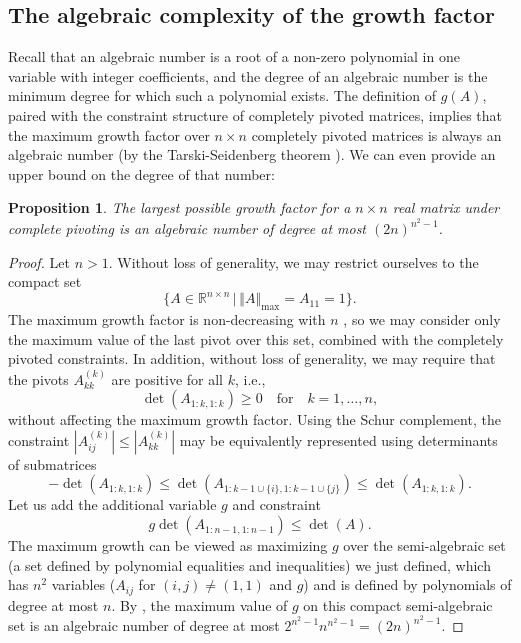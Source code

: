 \documentclass[reqno]{amsart}
\numberwithin{equation}{section}
\newcommand{\norm}[1]{\left\Vert #1 \right\Vert}
\newtheorem{proposition}[theorem]{Proposition}
\begin{document}
\subsection{The algebraic complexity of the growth factor} Recall that an algebraic number is a root of a non-zero polynomial in one variable with integer coefficients, and the degree of an algebraic number is the minimum degree for which such a polynomial exists. The definition of $g(A)$, paired with the constraint structure of completely pivoted matrices, implies that the maximum growth factor over $n \times n$ completely pivoted matrices is always an algebraic number (by the Tarski-Seidenberg theorem \cite[Theorem 1.5.8]{scheiderer2024course}). We can even provide an upper bound on the degree of that number:

\begin{proposition}\label{thm:algebraic}
The largest possible growth factor for a $n \times n$ real matrix under complete pivoting is an algebraic number of degree at most $(2n)^{n^2-1}$.
\end{proposition}

\begin{proof}
Let $n>1$. Without loss of generality, we may restrict ourselves to the compact set 
\begin{equation}\{A \in \mathbb{R}^{n \times n} \, | \, \norm{A}_{\max} = A_{11} = 1\}.\end{equation} 
The maximum growth factor is non-decreasing with $n$ \cite[Lemma 5.1]{edelman2024some}, so we may consider only the maximum value of the last pivot over this set, combined with the completely pivoted constraints. In addition, without loss of generality, we may require that the pivots $A^{(k)}_{kk}$ are positive for all $k$, i.e.,
\begin{equation} \det(A_{1:k,1:k}) \ge 0 \quad \text{for} \quad k = 1,\ldots,n, \end{equation}
without affecting the maximum growth factor. Using the Schur complement, the constraint $|A_{ij}^{(k)}|\le |A_{kk}^{(k)}|$ may be equivalently represented using determinants of submatrices
\begin{equation}-\det(A_{1:k,1:k}) \le \det(A_{1:k-1 \cup \{i\},1:k-1 \cup \{j\}}) \le \det(A_{1:k,1:k}).\end{equation}
Let us add the additional variable $g$ and constraint 
\begin{equation}g \det(A_{1:n-1,1:n-1}) \le \det(A).\end{equation}
The maximum growth can be viewed as maximizing $g$ over the semi-algebraic set (a set defined by polynomial equalities and inequalities) we just defined, which has $n^2$ variables ($A_{ij}$ for $(i,j) \ne (1,1)$ and $g$) and is defined by polynomials of degree at most $n$. By \cite[Theorem 1]{jeronimo2013minimum}, the maximum value of $g$ on this compact semi-algebraic set is an algebraic number of degree at most $2^{n^2 - 1} n^{n^2-1} = (2n)^{n^2-1}$.
\end{proof}
\end{document}
